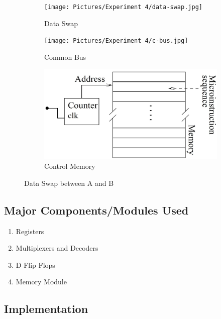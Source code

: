 \documentclass[a4paper]{article}
\begin{document}
\begin{figure}[h!]
    \centering
    \begin{subfigure}[b]{0.3\linewidth}
        \centering
        \texttt{[image: Pictures/Experiment 4/data-swap.jpg]}
        \caption{Data Swap}
        \label{subFig:d-swapAB}
    \end{subfigure}
    \begin{subfigure}[b]{0.3\linewidth}
        \centering
        \texttt{[image: Pictures/Experiment 4/c-bus.jpg]}
        \caption{Common Bus}
        \label{subFig:c-bus}
    \end{subfigure}
    \begin{subfigure}[b]{0.3\linewidth}
        \centering
        \includegraphics[width=\linewidth]{Pictures/Experiment 4/c-mem.jpg}
        \caption{Control Memory}
        \label{subFig:c-mem}
    \end{subfigure}
    \caption{Data Swap between A and B}
    \label{Fig:d-swap}
\end{figure}
\pagebreak

\subsection{Major Components/Modules Used}
\begin{enumerate}
    \item Registers
    \item Multiplexers and Decoders
    \item D Flip Flops
    \item Memory Module
\end{enumerate}

\subsection{Implementation}
\end{document}
